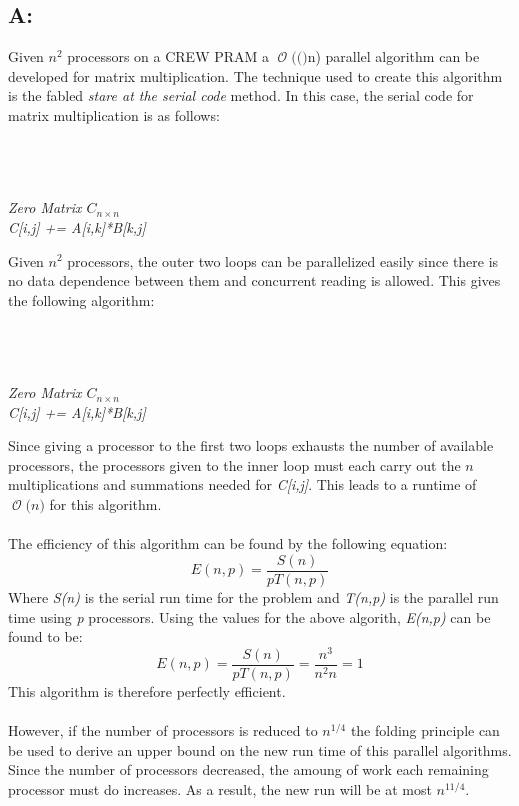 \documentclass[12pt]{article}
\newcommand{\BigO}[1]{\ensuremath{\operatorname{\mathcal{O}}\bigl(#1\bigr)}}
\begin{document}
\subsection*{A:}
Given $n^2$ processors on a CREW PRAM a \BigO(n) parallel algorithm
can be developed for matrix multiplication.  The technique used to 
create this algorithm is the fabled \textit{stare at the serial code}
method.  In this case, the serial code for matrix multiplication is as
follows:\\\\
\begin{algorithm}[H]
\\
\\
\textit{Zero Matrix $C_{n\times n}$}\\
{
{
{\textit{C[i,j] += A[i,k]*B[k,j]}}
}
}
\end{algorithm}
Given $n^2$ processors, the outer two loops can be parallelized easily
since there is no data dependence between them and concurrent reading
is allowed.  This gives the following algorithm:\\\\
\begin{algorithm}[H]
\\
\\
\textit{Zero Matrix $C_{n\times n}$}\\
{
{
{\textit{C[i,j] += A[i,k]*B[k,j]}}
}
}
\\
\end{algorithm}
Since giving a processor to the first two loops exhausts the number
of available processors, the processors given to the inner loop
must each carry out the $n$ multiplications and summations
needed for \textit{C[i,j]}.  This leads to a runtime of \BigO{n} for 
this algorithm.\\\\
The efficiency of this algorithm can be found by the following equation:
\[
    E(n,p) = \frac{S(n)}{pT(n,p)}
\]
Where \textit{S(n)} is the serial run time for the problem and \textit{T(n,p)}
is the parallel run time using \textit{p} processors.  Using the values for the
above algorith, \textit{E(n,p)} can be found to be:
\[
    E(n,p) = \frac{S(n)}{pT(n,p)} = \frac{n^3}{n^2 n} = 1
\]
This algorithm is therefore perfectly efficient.\\\\
However, if the number of processors is reduced to $n^{1/4}$ the folding
principle can be used to derive an upper bound on the new run time of 
this parallel algorithms.  Since the number of processors decreased,
the amoung of work each remaining processor must do increases.  As
a result, the new run will be at most $n^{11/4}$.
\end{document}
